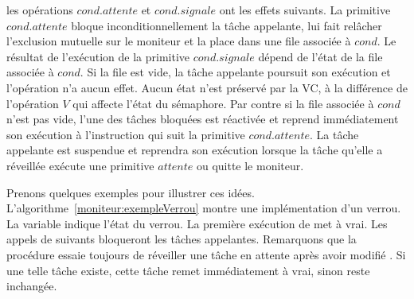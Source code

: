 les opérations $cond.attente$ et $cond.signale$ ont les effets suivants. La primitive $cond.attente$ bloque inconditionnellement la tâche appelante, lui fait relâcher l'exclusion mutuelle sur le moniteur et la place dans une file associée à $cond$. Le résultat de l'exécution de la primitive $cond.signale$ dépend de l'état de la file associée à $cond$. Si la file est vide, la tâche appelante poursuit son exécution et l'opération n'a aucun effet.  Aucun état n'est préservé par la VC, à la différence de l'opération $V$ qui affecte l'état du sémaphore. Par contre si la file associée à $cond$ n'est pas vide, l'une des tâches bloquées est réactivée et reprend immédiatement son exécution à l'instruction qui suit la primitive $cond.attente$. La tâche appelante est suspendue et reprendra son exécution lorsque la tâche qu'elle a réveillée exécute une primitive $attente$ ou quitte le moniteur.

Prenons quelques exemples pour illustrer ces idées. L'algorithme~\ref{moniteur:exempleVerrou} montre une implémentation d'un verrou. La variable  indique l'état du verrou. La première exécution de  met  à vrai. Les appels de  suivants bloqueront les tâches appelantes.  Remarquons que la procédure  essaie toujours de réveiller une tâche en attente après avoir modifié . Si une telle tâche existe, cette tâche remet immédiatement  à vrai, sinon  reste inchangée.

